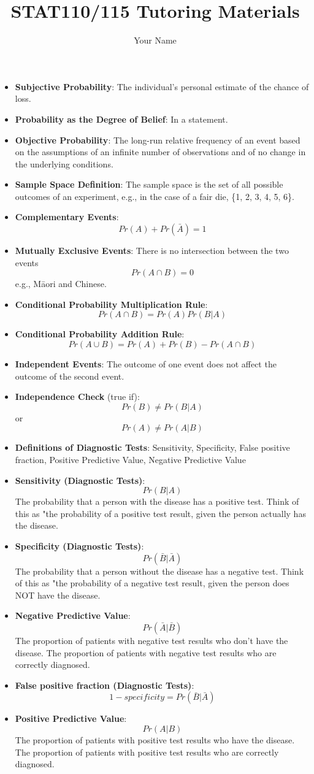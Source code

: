 \documentclass[12pt]{article}
\author{Your Name}
\title{STAT110/115 Tutoring Materials}
\date{}
\begin{document}
\pagestyle{fancy}

\begin{itemize}
\item \textbf{Subjective Probability}: The individual's personal estimate of the chance of loss.
\item \textbf{Probability as the Degree of Belief}: In a statement.
\item \textbf{Objective Probability}: The long-run relative frequency of an event based on the assumptions of an infinite number of observations and of no change in the underlying conditions.
\item \textbf{Sample Space Definition}: The sample space is the set of all possible outcomes of an experiment, e.g., in the case of a fair die, \{1, 2, 3, 4, 5, 6\}.
\item \textbf{Complementary Events}: $$Pr(A) + Pr(\bar{A}) = 1$$
\item \textbf{Mutually Exclusive Events}: There is no intersection between the two events $$Pr(A \cap B) = 0$$ e.g., Māori and Chinese.
\item \textbf{Conditional Probability Multiplication Rule}: $$Pr(A \cap B) = Pr(A) Pr(B|A)$$
\item \textbf{Conditional Probability Addition Rule}: $$Pr(A \cup B) = Pr(A) + Pr(B) - Pr(A \cap B)$$
\item \textbf{Independent Events}: The outcome of one event does not affect the outcome of the second event.
\item \textbf{Independence Check} (true if): $$Pr(B) \neq Pr(B | A)$$ or $$Pr(A) \neq Pr(A | B)$$
\item \textbf{Definitions of Diagnostic Tests}: Sensitivity, Specificity, False positive fraction, Positive Predictive Value, Negative Predictive Value
\item \textbf{Sensitivity (Diagnostic Tests)}: $$Pr(B | A)$$ The probability that a person with the disease has a positive test. Think of this as "the probability of a positive test result, given the person actually has the disease.
\item \textbf{Specificity (Diagnostic Tests)}: $$Pr(\bar{B} | \bar{A})$$ The probability that a person without the disease has a negative test. Think of this as "the probability of a negative test result, given the person does NOT have the disease.
\item \textbf{Negative Predictive Value}: $$Pr(\bar{A} | \bar{B})$$ The proportion of patients with negative test results who don't have the disease. The proportion of patients with negative test results who are correctly diagnosed.
\item \textbf{False positive fraction (Diagnostic Tests)}: $$1 - specificity = Pr(\bar{B} | \bar{A})$$
\item \textbf{Positive Predictive Value}: $$Pr(A | B)$$ The proportion of patients with positive test results who have the disease. The proportion of patients with positive test results who are correctly diagnosed.
\end{itemize}
\end{document}
